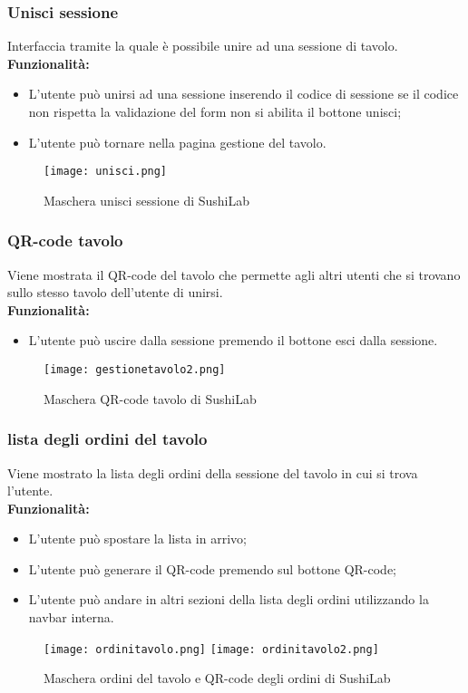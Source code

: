 \subsubsection{Unisci sessione}
Interfaccia tramite la quale è possibile unire ad una sessione di tavolo.\\
\textbf{Funzionalità:}
\begin{itemize}
    \item L'utente può  unirsi ad una sessione inserendo il codice di sessione se il codice non rispetta la validazione del form non si abilita il bottone unisci;
    \item L'utente può tornare nella pagina gestione del tavolo.
\end{itemize}
\begin{figure}[H]
    \centering
    \texttt{[image: unisci.png]}
    \caption{Maschera unisci sessione di SushiLab}
\end{figure}


\subsubsection{QR-code tavolo}
Viene mostrata il QR-code del tavolo che permette agli altri utenti che si trovano sullo stesso tavolo dell'utente di unirsi.\\
\textbf{Funzionalità:}
\begin{itemize}
    \item L'utente può uscire dalla sessione premendo il bottone esci dalla sessione.
\end{itemize}
\begin{figure}[H]
    \centering
    \texttt{[image: gestionetavolo2.png]}
    \caption{Maschera QR-code tavolo di SushiLab}
\end{figure}


\subsubsection{lista degli ordini del tavolo}
Viene mostrato la lista degli ordini della sessione del tavolo in cui si trova l'utente.\\
\textbf{Funzionalità:}
\begin{itemize}
    \item L'utente può spostare la lista in arrivo;
    \item L'utente può generare il QR-code premendo sul bottone QR-code;
    \item L'utente può andare in altri sezioni della lista degli ordini utilizzando la navbar interna.
\end{itemize}
\begin{figure}[H]
    \centering
    \texttt{[image: ordinitavolo.png]}
    \texttt{[image: ordinitavolo2.png]}
    \caption{Maschera ordini del tavolo e QR-code degli ordini di SushiLab}
\end{figure}


